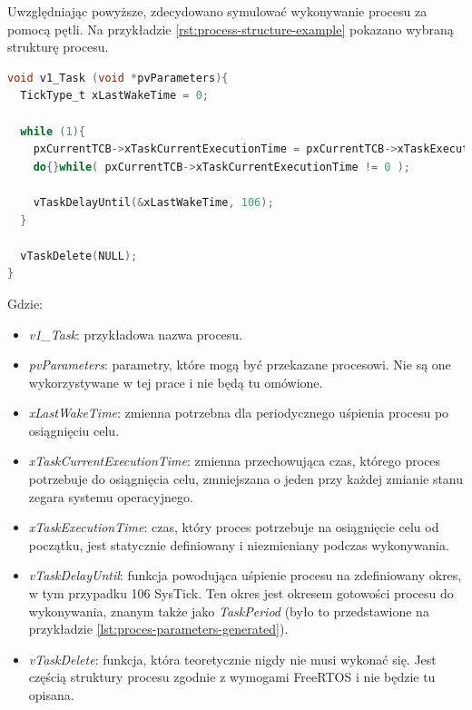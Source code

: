 \documentclass[../../main]{subfiles}
\begin{document}
Uwzględniając powyższe, zdecydowano symulować wykonywanie procesu za pomocą pętli. Na przykładzie \ref{rst:process-structure-example} pokazano wybraną strukturę procesu.

\begin{lstlisting}[language=C, label={rst:process-structure-example}, caption={Używana struktura procesu}]
void v1_Task (void *pvParameters){
  TickType_t xLastWakeTime = 0;

  while (1){
    pxCurrentTCB->xTaskCurrentExecutionTime = pxCurrentTCB->xTaskExecutionTime;
    do{}while( pxCurrentTCB->xTaskCurrentExecutionTime != 0 );

    vTaskDelayUntil(&xLastWakeTime, 106);
  }

  vTaskDelete(NULL);
}
\end{lstlisting}

Gdzie:

\begin{itemize}
    \item \textit{v1\_Task}: przykładowa nazwa procesu.
    \item \textit{pvParameters}: parametry, które mogą być przekazane procesowi. Nie są one wykorzystywane w tej prace i nie będą tu omówione.
    \item \textit{xLastWakeTime}: zmienna potrzebna dla periodycznego uśpienia procesu po osiągnięciu celu.
    \item \textit{xTaskCurrentExecutionTime}: zmienna przechowująca czas, którego proces potrzebuje do osiągnięcia celu, zmniejszana o jeden przy każdej zmianie stanu zegara systemu operacyjnego.
    \item \textit{xTaskExecutionTime}: czas, który proces potrzebuje na osiągnięcie celu od początku, jest statycznie definiowany i niezmieniany podczas wykonywania.
    \item \textit{vTaskDelayUntil}: funkcja powodująca uśpienie procesu na zdefiniowany okres, w tym przypadku 106 SysTick. Ten okres jest okresem gotowości procesu do wykonywania, znanym także jako \textit{TaskPeriod} (było to przedstawione na przykładzie \ref{lst:proces-parameters-generated}).
    \item \textit{vTaskDelete}: funkcja, która teoretycznie nigdy nie musi wykonać się. Jest częścią struktury procesu zgodnie z wymogami FreeRTOS i nie będzie tu opisana.
\end{itemize}
\end{document}
